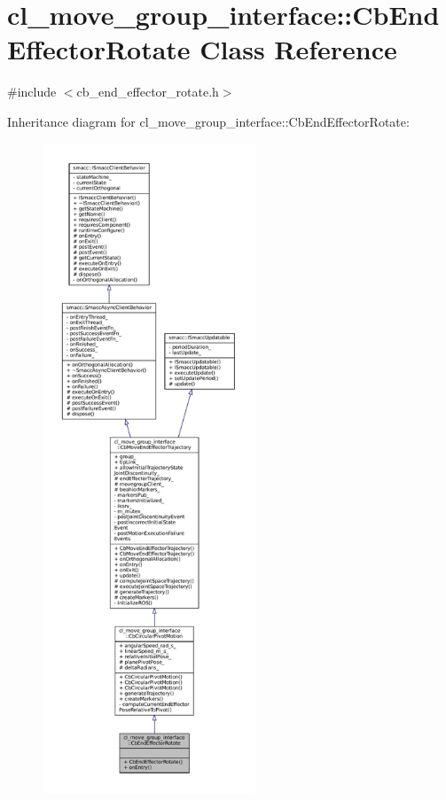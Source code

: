 \hypertarget{classcl__move__group__interface_1_1CbEndEffectorRotate}{}\section{cl\+\_\+move\+\_\+group\+\_\+interface\+:\+:Cb\+End\+Effector\+Rotate Class Reference}
\label{classcl__move__group__interface_1_1CbEndEffectorRotate}


{\ttfamily \#include $<$cb\+\_\+end\+\_\+effector\+\_\+rotate.\+h$>$}



Inheritance diagram for cl\+\_\+move\+\_\+group\+\_\+interface\+:\+:Cb\+End\+Effector\+Rotate\+:
\nopagebreak
\begin{figure}[H]
\begin{center}
\leavevmode
\includegraphics[height=550pt]{classcl__move__group__interface_1_1CbEndEffectorRotate__inherit__graph}
\end{center}
\end{figure}


